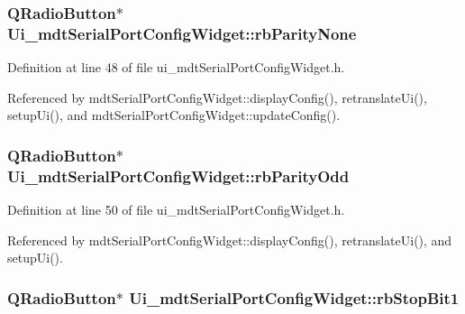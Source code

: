 \hypertarget{class_ui__mdt_serial_port_config_widget_a3ad8d6b798356ba0891649e75182e1dd}{
\subsubsection[{rb\-Parity\-None}]{\setlength{\rightskip}{0pt plus 5cm}Q\-Radio\-Button$\ast$ Ui\-\_\-mdt\-Serial\-Port\-Config\-Widget\-::rb\-Parity\-None}}\label{class_ui__mdt_serial_port_config_widget_a3ad8d6b798356ba0891649e75182e1dd}


Definition at line 48 of file ui\-\_\-mdt\-Serial\-Port\-Config\-Widget.\-h.



Referenced by mdt\-Serial\-Port\-Config\-Widget\-::display\-Config(), retranslate\-Ui(), setup\-Ui(), and mdt\-Serial\-Port\-Config\-Widget\-::update\-Config().

\hypertarget{class_ui__mdt_serial_port_config_widget_a0115a61b2d5d18a69dfe97c9b38ab171}{
\subsubsection[{rb\-Parity\-Odd}]{\setlength{\rightskip}{0pt plus 5cm}Q\-Radio\-Button$\ast$ Ui\-\_\-mdt\-Serial\-Port\-Config\-Widget\-::rb\-Parity\-Odd}}\label{class_ui__mdt_serial_port_config_widget_a0115a61b2d5d18a69dfe97c9b38ab171}


Definition at line 50 of file ui\-\_\-mdt\-Serial\-Port\-Config\-Widget.\-h.



Referenced by mdt\-Serial\-Port\-Config\-Widget\-::display\-Config(), retranslate\-Ui(), and setup\-Ui().

\hypertarget{class_ui__mdt_serial_port_config_widget_a44b2250cbc0fdb06eccfe6352b276fe4}{
\subsubsection[{rb\-Stop\-Bit1}]{\setlength{\rightskip}{0pt plus 5cm}Q\-Radio\-Button$\ast$ Ui\-\_\-mdt\-Serial\-Port\-Config\-Widget\-::rb\-Stop\-Bit1}}\label{class_ui__mdt_serial_port_config_widget_a44b2250cbc0fdb06eccfe6352b276fe4}


